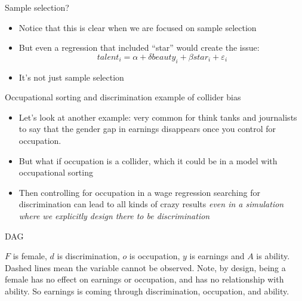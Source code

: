 \documentclass{beamer}
\begin{document}
\begin{frame}{Sample selection?}

\begin{itemize}
\item Notice that this is clear when we are focused on sample selection
\item But even a regression that included ``star'' would create the issue:$$talent_i = \alpha + \delta beauty_i + \beta star_i + \varepsilon_i$$
\item It's not just sample selection 
\end{itemize}

\end{frame}


\begin{frame}{Occupational sorting and discrimination example of collider bias}

  \begin{itemize}
    \item Let's look at another example: very common for think tanks and journalists to say that the gender gap in earnings disappears once you control for occupation.
    \item But what if occupation is a collider, which it could be in a model with occupational sorting
    \item Then controlling for occupation in a wage regression searching for discrimination can lead to all kinds of crazy results \emph{even in a simulation where we explicitly design there to be discrimination}
  \end{itemize}

\end{frame}

\begin{frame}{DAG}

  \begin{center}
  \end{center}

  $F$ is female, $d$ is discrimination, $o$ is occupation, $y$ is earnings and $A$ is ability. Dashed lines mean the variable cannot be observed. Note, by design, being a female has no effect on earnings or occupation, and has no relationship with ability. So earnings is coming through discrimination, occupation, and ability.

\end{frame}
\end{document}
